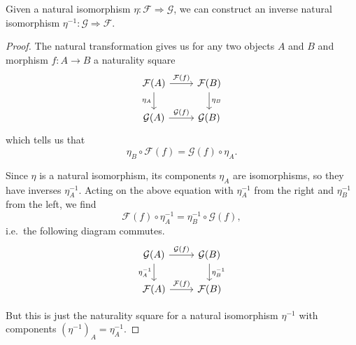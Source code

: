 \documentclass[main.tex]{subfiles}
\begin{document}
\begin{lemma}
  \label{lemma:naturalisomorphismshaveinverses}
  Given a natural isomorphism $\eta\colon \mathcal{F} \Rightarrow \mathcal{G}$, we can construct an inverse natural isomorphism $\eta^{-1}\colon \mathcal{G} \Rightarrow \mathcal{F}$.
\end{lemma}
\begin{proof}
  The natural transformation gives us for any two objects $A$ and $B$ and morphism $f\colon A \to B$ a naturality square
  \begin{equation*}
    \begin{tikzcd}
      \mathcal{F}(A)
      \arrow[r, "\mathcal{F}(f)"]
      \arrow[d, swap, "\eta_{A}"]
      & \mathcal{F}(B)
      \arrow[d, "\eta_{B}"]
      \\
      \mathcal{G}(A)
      \arrow[r, "\mathcal{G}(f)"]
      & \mathcal{G}(B)
    \end{tikzcd}
  \end{equation*}
  which tells us that
  \begin{equation*}
    \eta_{B} \circ \mathcal{F}(f) = \mathcal{G}(f) \circ \eta_{A}.
  \end{equation*}

  Since $\eta$ is a natural isomorphism, its components $\eta_{A}$ are isomorphisms, so they have inverses $\eta_{A}^{-1}$. Acting on the above equation with $\eta_{A}^{-1}$ from the right and $\eta_{B}^{-1}$ from the left, we find
  \begin{equation*}
    \mathcal{F}(f) \circ \eta_{A}^{-1} = \eta_{B}^{-1} \circ \mathcal{G}(f),
  \end{equation*}
  i.e.\ the following diagram commutes.
  \begin{equation*}
    \begin{tikzcd}
      \mathcal{G}(A)
      \arrow[r, "\mathcal{G}(f)"]
      \arrow[d, swap, "\eta_{A}^{-1}"]
      & \mathcal{G}(B)
      \arrow[d, "\eta_{B}^{-1}"]
      \\
      \mathcal{F}(A)
      \arrow[r, "\mathcal{F}(f)"]
      & \mathcal{F}(B)
    \end{tikzcd}
  \end{equation*}

  But this is just the naturality square for a natural isomorphism $\eta^{-1}$ with components ${(\eta^{-1})}_{A} = \eta_{A}^{-1}$.
\end{proof}
\end{document}
